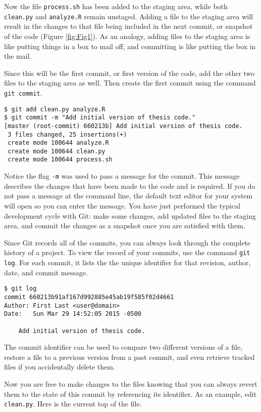 Now the file \verb|process.sh| has been added to the staging area, while both \verb|clean.py| and \verb|analyze.R| remain unstaged.
Adding a file to the staging area will result in the changes to that file being included in the next commit, or snapshot of the code (Figure \ref{fig:Fig1}).
As an analogy, adding files to the staging area is like putting things in a box to mail off, and committing is like putting the box in the mail.

Since this will be the first commit, or first version of the code, add the other two files to the staging area as well.
Then create the first commit using the command \verb|git commit|.

\begin{lstlisting}
$ git add clean.py analyze.R
$ git commit -m "Add initial version of thesis code."
[master (root-commit) 660213b] Add initial version of thesis code.
 3 files changed, 25 insertions(+)
 create mode 100644 analyze.R
 create mode 100644 clean.py
 create mode 100644 process.sh
\end{lstlisting}

Notice the flag \verb|-m| was used to pass a message for the commit.
This message describes the changes that have been made to the code and is required.
If you do not pass a message at the command line, the default text editor for your system will open so you can enter the message.
You have just performed the typical development cycle with Git:
make some changes, add updated files to the staging area, and commit the changes as a snapshot once you are satisfied with them.

Since Git records all of the commits, you can always look through the complete history of a project.
To view the record of your commits, use the command \verb|git log|.
For each commit, it lists the the unique identifier for that revision, author, date, and commit message.

\begin{lstlisting}
$ git log
commit 660213b91af167d992885e45ab19f585f02d4661
Author: First Last <user@domain>
Date:   Sun Mar 29 14:52:05 2015 -0500

    Add initial version of thesis code.
\end{lstlisting}

The commit identifier can be used to compare two different versions of a file, restore a file to a previous version from a past commit, and even retrieve tracked files if you accidentally delete them.

Now you are free to make changes to the files knowing that you can always revert them to the state of this commit by referencing its identifier.
As an example, edit \verb|clean.py|.
Here is the current top of the file.

